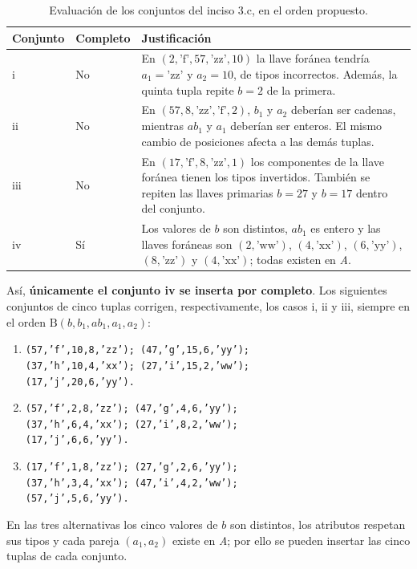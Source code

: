 \begin{table}[htbp]
  \centering
  \caption{Evaluación de los conjuntos del inciso 3.c, en el orden propuesto.}
  \label{tab:ej3-c}
  \small
  \begin{tabularx}{\textwidth}{@{}l l >{\raggedright\arraybackslash}X@{}}
    \toprule
    \textbf{Conjunto} & \textbf{Completo} & \textbf{Justificación} \\
    \midrule
    i & No & En $(2,\text{'f'},57,\text{'zz'},10)$ la llave foránea
      tendría $a_1=\text{'zz'}$ y $a_2=10$, de tipos incorrectos.
      Además, la quinta tupla repite $b=2$ de la primera. \\
    ii & No & En $(57,8,\text{'zz'},\text{'f'},2)$, $b_1$ y $a_2$
      deberían ser cadenas, mientras $ab_1$ y $a_1$ deberían ser enteros.
      El mismo cambio de posiciones afecta a las demás tuplas. \\
    iii & No & En $(17,\text{'f'},8,\text{'zz'},1)$ los componentes
      de la llave foránea tienen los tipos invertidos. También se repiten
      las llaves primarias $b=27$ y $b=17$ dentro del conjunto. \\
    iv & Sí & Los valores de $b$ son distintos, $ab_1$ es entero y las
      llaves foráneas son $(2,\text{'ww'})$, $(4,\text{'xx'})$,
      $(6,\text{'yy'})$, $(8,\text{'zz'})$ y $(4,\text{'xx'})$;
      todas existen en \emph{A}. \\
    \bottomrule
  \end{tabularx}
\end{table}

Así, \textbf{únicamente el conjunto iv se inserta por completo}.
Los siguientes conjuntos de cinco tuplas corrigen, respectivamente, los
casos i, ii y iii, siempre en el orden
$\mathrm{B}(b,b_1,ab_1,a_1,a_2)$:

\begin{enumerate}[label=\roman*.,leftmargin=*,itemsep=0.2em]
  \item \texttt{(57,'f',10,8,'zz'); (47,'g',15,6,'yy');}\\
    \texttt{(37,'h',10,4,'xx'); (27,'i',15,2,'ww');}\\
    \texttt{(17,'j',20,6,'yy').}
  \item \texttt{(57,'f',2,8,'zz'); (47,'g',4,6,'yy');}\\
    \texttt{(37,'h',6,4,'xx'); (27,'i',8,2,'ww');}\\
    \texttt{(17,'j',6,6,'yy').}
  \item \texttt{(17,'f',1,8,'zz'); (27,'g',2,6,'yy');}\\
    \texttt{(37,'h',3,4,'xx'); (47,'i',4,2,'ww');}\\
    \texttt{(57,'j',5,6,'yy').}
\end{enumerate}

En las tres alternativas los cinco valores de $b$ son distintos, los
atributos respetan sus tipos y cada pareja $(a_1,a_2)$ existe en
\emph{A}; por ello se pueden insertar las cinco tuplas de cada conjunto.

